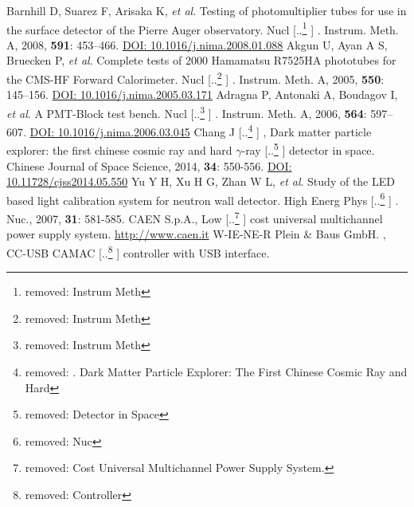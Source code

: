 \documentclass{nst}
\providecommand{\DIFadd}[1]{{\protect\color{blue} \sf #1}} %
\providecommand{\DIFdel}[1]{{\protect\color{red} [..\footnote{removed: #1} ]}} %
\providecommand{\DIFaddbegin}{} %
\providecommand{\DIFaddend}{} %
\providecommand{\DIFdelbegin}{} %
\providecommand{\DIFdelend}{} %
\begin{document}
\begin{thebibliography}{99}
	 Barnhill D, Suarez F, Arisaka K, \emph{et al}. Testing of photomultiplier tubes for use in the surface detector of the {Pierre} {Auger} observatory. Nucl\DIFdelbegin \DIFdel{Instrum Meth }\DIFdelend \DIFaddbegin \DIFadd{. Instrum. Meth. }\DIFaddend A, 2008, {\bf 591}: 453--466.
	\href{http://dx.doi.org/10.1016/j.nima.2008.01.088}{DOI: 10.1016/j.nima.2008.01.088}
	 Akgun U, Ayan A S, Bruecken P, \emph{et al}. Complete tests of 2000 {Hamamatsu} {R}7525HA phototubes for the {CMS}-{HF} {Forward} {Calorimeter}. Nucl\DIFdelbegin \DIFdel{Instrum Meth }\DIFdelend \DIFaddbegin \DIFadd{. Instrum. Meth. }\DIFaddend A, 2005, {\bf 550}: 145--156.
	\href{http://dx.doi.org/10.1016/j.nima.2005.03.171}{DOI: 10.1016/j.nima.2005.03.171}
	 Adragna P, Antonaki A, Boudagov I, \emph{et al}. A {PMT}-{Block} test bench. Nucl\DIFdelbegin \DIFdel{Instrum Meth }\DIFdelend \DIFaddbegin \DIFadd{. Instrum. Meth. }\DIFaddend A, 2006, {\bf 564}: 597--607.
	\href{http://dx.doi.org/10.1016/j.nima.2006.03.045}{DOI: 10.1016/j.nima.2006.03.045}
	 Chang J\DIFdelbegin \DIFdel{. Dark Matter Particle Explorer: The First Chinese Cosmic Ray and Hard }\DIFdelend \DIFaddbegin \DIFadd{, Dark matter particle explorer: the first chinese cosmic ray and hard }\DIFaddend $\gamma$-ray \DIFdelbegin \DIFdel{Detector in Space}\DIFdelend \DIFaddbegin \DIFadd{detector in space}\DIFaddend . Chinese Journal of Space Science, 2014, {\bf 34}: 550-556.
	\href{http://dx.doi.org/10.11728/cjss2014.05.550}{DOI: 10.11728/cjss2014.05.550}
	 Yu Y H, Xu H G, Zhan W L, \emph{et al}. Study of the LED based light calibration system for neutron wall detector. High Energ Phys\DIFdelbegin \DIFdel{Nuc}\DIFdelend \DIFaddbegin \DIFadd{. Nuc.}\DIFaddend , 2007, {\bf 31}: 581-585.
	 {CAEN S.p.A.}, Low \DIFdelbegin \DIFdel{Cost Universal Multichannel Power Supply System. }%
\DIFdelend \DIFaddbegin \DIFadd{cost universal multichannel power supply system. }\href{http://www.caen.it/csite/CaenProd.jsp?idmod=491&parent=20}{http://www.caen.it}
	\DIFaddend {} {W-IE-NE-R Plein \& Baus GmbH.}\DIFaddbegin \DIFadd{, }\DIFaddend {CC-USB CAMAC \DIFdelbegin \DIFdel{Controller }\DIFdelend \DIFaddbegin \DIFadd{controller }\DIFaddend with USB interface}. \DIFdelbegin %

\end{thebibliography}
\end{document}
